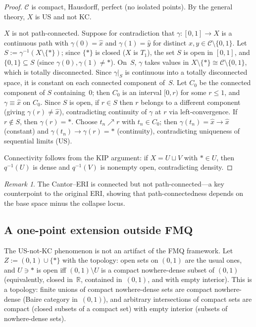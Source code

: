 \documentclass[11pt]{article}
\theoremstyle{definition}
\theoremstyle{remark}
\newtheorem{remark}[theorem]{Remark}
\begin{document}
\begin{proof}
$\mathcal{C}$ is compact, Hausdorff, perfect (no isolated points). By
the general theory, $X$ is US and not KC.

$X$ is not path-connected. Suppose for contradiction that
$\gamma\colon [0,1] \to X$ is a continuous path with $\gamma(0) = \hat{x}$ and
$\gamma(1) = \hat{y}$ for distinct $x,y \in \mathcal{C} \setminus \{0,1\}$.
Let $S := \gamma^{-1}(X \setminus \{\ast\})$; since $\{\ast\}$ is closed
($X$ is $T_1$), the set $S$ is open in $[0,1]$, and
$\{0,1\} \subseteq S$ (since $\gamma(0), \gamma(1) \neq \ast$).
On~$S$, $\gamma$ takes values in
$X \setminus \{\ast\} \cong \mathcal{C} \setminus \{0,1\}$, which is
totally disconnected.
Since $\gamma|_S$ is continuous into a totally disconnected space, it is
constant on each connected component of~$S$.
Let $C_0$ be the connected component of $S$ containing~$0$;
then $C_0$ is an interval $[0, r)$ for some $r \leq 1$, and
$\gamma \equiv \hat{x}$ on $C_0$.
Since $S$ is open, if $r \in S$ then $r$ belongs to a different
component (giving $\gamma(r) \neq \hat{x}$), contradicting
continuity of $\gamma$ at $r$ via left-convergence.
If $r \notin S$, then $\gamma(r) = \ast$.
Choose $t_n \nearrow r$ with $t_n \in C_0$; then
$\gamma(t_n) = \hat{x} \to \hat{x}$ (constant) and
$\gamma(t_n) \to \gamma(r) = \ast$ (continuity),
contradicting uniqueness of sequential limits (US).

Connectivity follows from the KIP argument: if $X = U \sqcup V$ with
$\ast \in U$, then $q^{-1}(U)$ is dense and $q^{-1}(V)$ is nonempty open, contradicting
density.
\end{proof}

\begin{remark}\label{rem:cantorcounterpoint}
The Cantor--ERI is connected but not path-connected---a key counterpoint
to the original ERI, showing that path-connectedness depends on the
base space minus the collapse locus.
\end{remark}

\subsection{A one-point extension outside FMQ}\label{sec:onepoint}

The US-not-KC phenomenon is not an artifact of the FMQ framework.
Let $Z := (0,1) \cup \{\ast\}$ with the topology: open sets on
$(0,1)$ are the usual ones, and $U \ni \ast$ is open iff
$(0,1) \setminus U$ is a compact nowhere-dense subset of $(0,1)$
(equivalently, closed in~$\mathbb{R}$, contained in~$(0,1)$,
and with empty interior).
This is a topology: finite unions of compact nowhere-dense sets are
compact nowhere-dense (Baire category in~$(0,1)$), and arbitrary
intersections of compact sets are compact (closed subsets of a
compact set) with empty interior (subsets of nowhere-dense sets).
\end{document}
